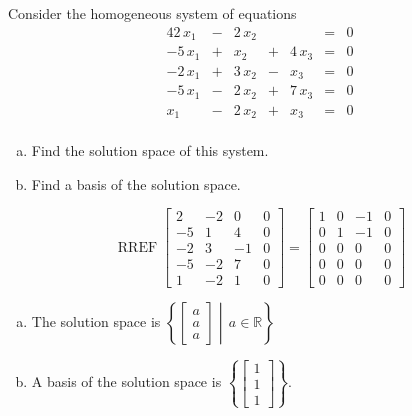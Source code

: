 
\begin{exerciseStatement}


Consider the homogeneous system of equations 
\begin{alignat*}{4} 2 \, x_{1} &-& 2 \, x_{2} & &  &=& 0 \\-5 \, x_{1} &+& x_{2} &+& 4 \, x_{3} &=& 0 \\-2 \, x_{1} &+& 3 \, x_{2} &-& x_{3} &=& 0 \\-5 \, x_{1} &-& 2 \, x_{2} &+& 7 \, x_{3} &=& 0 \\x_{1} &-& 2 \, x_{2} &+& x_{3} &=& 0 \\ \end{alignat*}
            


\begin{enumerate}[(a)]
\item  Find the solution space of this system.
\item  Find a basis of the solution space.
\end{enumerate}
    
\end{exerciseStatement}
    
\begin{exerciseAnswer} 


\[\operatorname{RREF} \left[\begin{array}{ccc|c}
2 & -2 & 0 & 0 \\
-5 & 1 & 4 & 0 \\
-2 & 3 & -1 & 0 \\
-5 & -2 & 7 & 0 \\
1 & -2 & 1 & 0
\end{array}\right] = \left[\begin{array}{ccc|c}
1 & 0 & -1 & 0 \\
0 & 1 & -1 & 0 \\
0 & 0 & 0 & 0 \\
0 & 0 & 0 & 0 \\
0 & 0 & 0 & 0
\end{array}\right] \]


\begin{enumerate}[(a)]
\item The solution space is \( \left\{ \left[\begin{array}{c}
a \\
a \\
a
\end{array}\right] \middle|\,a\in\mathbb{R}\right\} \)
\item A basis of the solution space is \( \left\{ \left[\begin{array}{c}
1 \\
1 \\
1
\end{array}\right] \right\} \).
\end{enumerate}
    
\end{exerciseAnswer}
    
